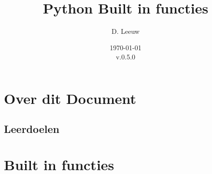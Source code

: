 \documentclass[a4paper,12pt,twoside,openright,titlepage]{article}
\author{D. Leeuw}
\title{Python Built in functies}
\date{\today\\v.0.5.0}
\date{\today\\
0.5.0\\
\vfill
\raggedright
\copyright\ 2025 Dennis Leeuw\\
}
\begin{document}

\maketitle


\section{Over dit Document}
\subsection{Leerdoelen}



\section{Built in functies}

%
%

\printindex
\end{document}
